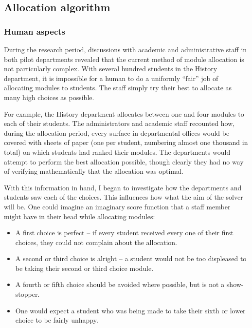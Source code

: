 
\subsection{Allocation algorithm}



\subsubsection{Human aspects}
\label{sec:algo_humanaspects}

During the research period, discussions with academic and administrative staff
in both pilot departments revealed that the current method of module
allocation is not particularly complex. With several hundred students in the
History department, it is impossible for a human to do a uniformly ``fair''
job of allocating modules to students. The staff simply try their best to
allocate as many high choices as possible.

For example, the History department allocates between one and four modules to
each of their students. The administrators and academic staff recounted how,
during the allocation period, every surface in departmental offices would be
covered with sheets of paper (one per student, numbering almost one
thousand in total) on which students had ranked their modules. The departments
would attempt to perform the best allocation possible, though clearly they had
no way of verifying mathematically that the allocation was optimal.

With this information in hand, I began to investigate how the departments and
students saw each of the choices. This influences how what the aim of the
solver will be. One could imagine an imaginary score function that a staff
member might have in their head while allocating modules:

\begin{itemize}
  \item A first choice is perfect -- if every student received every one of
        their first choices, they could not complain about the allocation.
  \item A second or third choice is alright -- a student would not be too
        displeased to be taking their second or third choice module.
  \item A fourth or fifth choice should be avoided where possible, but is not
        a show-stopper.
  \item One would expect a student who was being made to take their sixth or
        lower choice to be fairly unhappy.
\end{itemize}

